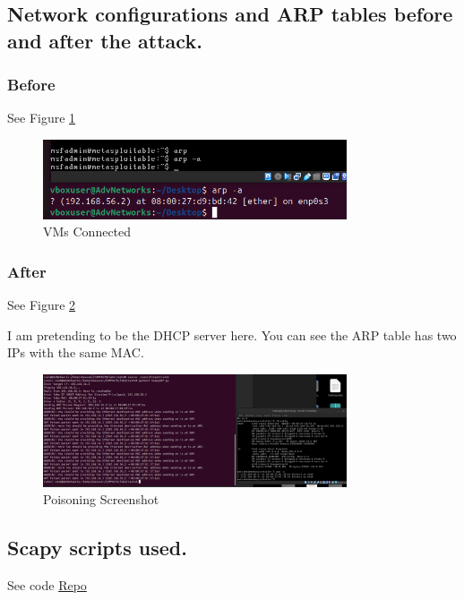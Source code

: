 \documentclass{article}
\begin{document}
\subsection*{Network configurations and ARP tables before and after the attack.}

\subsubsection*{Before}

See Figure \ref{fig:before}

\begin{figure}[h]
    \centering
    \includegraphics[width=0.8\textwidth]{task1/screenshot/before.png}
    \caption{VMs Connected}
    \label{fig:before}
\end{figure}

\subsubsection*{After}

See Figure \ref{fig:after}

I am pretending to be the DHCP server here. You can see the ARP table has two IPs with the same MAC. 

\begin{figure}[h]
    \centering
    \includegraphics[width=0.8\textwidth]{task1/screenshot/poison.png}
    \caption{Poisoning Screenshot}
    \label{fig:after}
\end{figure}

\subsection*{Scapy scripts used.}

See code \href{https://github.com/MattBelanger321/COMP8670/tree/master/lab3/task1}{Repo}
\end{document}
